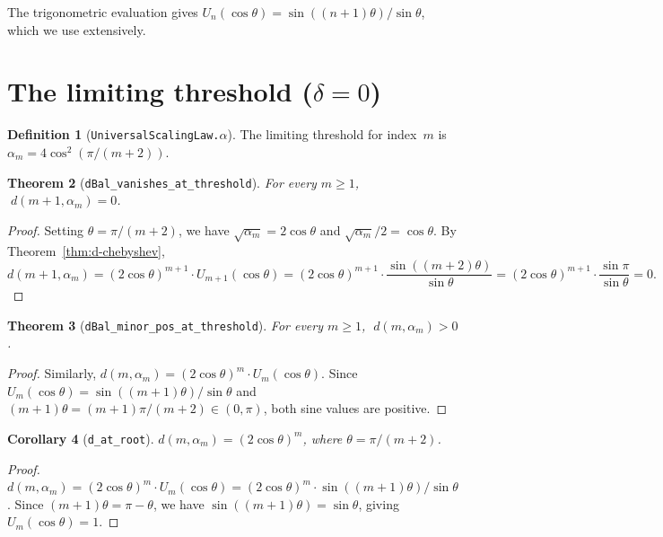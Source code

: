 \documentclass[11pt,a4paper]{article}
\theoremstyle{plain}
\newtheorem{theorem}{Theorem}[section]
\newtheorem{corollary}[theorem]{Corollary}
\theoremstyle{definition}
\newtheorem{definition}[theorem]{Definition}
\newcommand{\alpham}{\alpha_m}
\newcommand{\chebU}{U}
\newcommand{\lean}[1]{\texttt{#1}}
\begin{document}
The trigonometric evaluation gives
$\chebU_n(\cos\theta) = \sin((n{+}1)\theta)/\sin\theta$,
which we use extensively.

\section{The limiting threshold ($\delta = 0$)}
\label{sec:threshold}

\begin{definition}[\lean{UniversalScalingLaw.$\alpha$}]
The limiting threshold for index~$m$ is
$\alpham = 4\cos^2(\pi/(m{+}2))$.
\end{definition}

\begin{theorem}[\lean{dBal\_vanishes\_at\_threshold}]
\label{thm:vanish}
For every $m \ge 1$, $\;d(m{+}1, \alpham) = 0$.
\end{theorem}

\begin{proof}
Setting $\theta = \pi/(m{+}2)$, we have $\sqrt{\alpham} = 2\cos\theta$ and
$\sqrt{\alpham}/2 = \cos\theta$.  By Theorem~\ref{thm:d-chebyshev},
\[
  d(m{+}1,\alpham) = (2\cos\theta)^{m+1} \cdot \chebU_{m+1}(\cos\theta)
  = (2\cos\theta)^{m+1} \cdot \frac{\sin((m{+}2)\theta)}{\sin\theta}
  = (2\cos\theta)^{m+1} \cdot \frac{\sin\pi}{\sin\theta} = 0.
\]
\end{proof}

\begin{theorem}[\lean{dBal\_minor\_pos\_at\_threshold}]
\label{thm:minor-pos}
For every $m \ge 1$, $\;d(m, \alpham) > 0$.
\end{theorem}

\begin{proof}
Similarly, $d(m,\alpham) = (2\cos\theta)^m \cdot \chebU_m(\cos\theta)$.
Since $\chebU_m(\cos\theta) = \sin((m{+}1)\theta)/\sin\theta$
and $(m{+}1)\theta = (m{+}1)\pi/(m{+}2) \in (0,\pi)$,
both sine values are positive.
\end{proof}

\begin{corollary}[\lean{d\_at\_root}]
\label{cor:d-at-root}
$d(m, \alpham) = (2\cos\theta)^m$, where $\theta = \pi/(m{+}2)$.
\end{corollary}

\begin{proof}
$d(m,\alpham) = (2\cos\theta)^m \cdot \chebU_m(\cos\theta) =
(2\cos\theta)^m \cdot \sin((m{+}1)\theta)/\sin\theta$.
Since $(m{+}1)\theta = \pi - \theta$, we have
$\sin((m{+}1)\theta) = \sin\theta$, giving $\chebU_m(\cos\theta) = 1$.
\end{proof}
\end{document}
